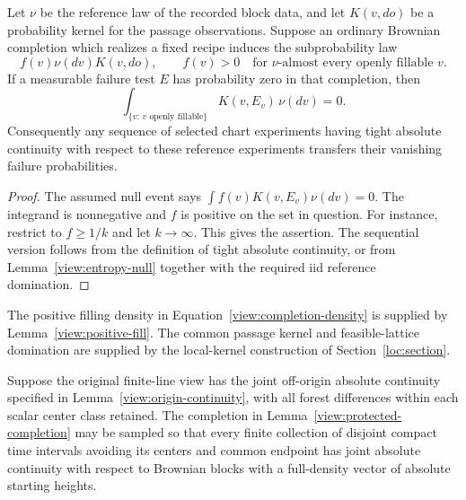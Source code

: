 \begin{lemma}\label{view:fillable-null}
Let $\nu$ be the reference law of the recorded block data, and let $K(v,do)$
be a probability kernel for the passage observations.  Suppose an ordinary
Brownian completion which realizes a fixed recipe induces the subprobability
law
\begin{equation}\label{view:completion-density}
 f(v)\nu(dv)K(v,do),\qquad f(v)>0\quad
 \text{for $\nu$-almost every openly fillable $v$}.
\end{equation}
If a measurable failure test $E$ has probability zero in that completion,
then
\[
 \int_{\{v:\,v\text{ openly fillable}\}}K(v,E_v)\,\nu(dv)=0.
\]
Consequently any sequence of selected chart experiments having tight
absolute continuity with respect to these reference experiments transfers
their vanishing failure probabilities.
\end{lemma}

\begin{proof}
The assumed null event says $\int f(v)K(v,E_v)\nu(dv)=0$.  The integrand is
nonnegative and $f$ is positive on the set in question.  For instance,
restrict to $f\ge1/k$ and let $k\to\infty$.  This gives the assertion.
The sequential version follows from the definition of tight absolute
continuity, or from Lemma~\ref{view:entropy-null} together with the required
iid reference domination.
\end{proof}

The positive filling density in Equation~\eqref{view:completion-density}
is supplied by Lemma~\ref{view:positive-fill}.  The common passage kernel
and feasible-lattice domination are supplied by the local-kernel
construction of Section~\ref{loc:section}.

\begin{lemma}\label{view:completion-ac}
Suppose the original finite-line view has the joint off-origin absolute
continuity specified in Lemma~\ref{view:origin-continuity}, with all
forest differences within each scalar center class retained.  The completion
in Lemma~\ref{view:protected-completion} may be sampled so that every
finite collection of disjoint compact time intervals avoiding its
centers and common endpoint has joint absolute continuity with respect
to Brownian blocks with a full-density vector of absolute starting
heights.
\end{lemma}

